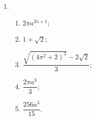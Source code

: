 % 
\begin{enumerate}
    \item %
        \begin{enumerate}[(1)]
            \item %
                $2\pi a^{2n+1}$;
            \item %
                $1 + \sqrt{2}$;
            \item %
                $\dfrac{\sqrt{(4\pi^2+2)^3} - 2\sqrt{2}}{3}$;
            \item %
                $\dfrac{2\pi a^3}{3}$;
            \item %
                $\dfrac{256a^3}{15}$.
        \end{enumerate}
\end{enumerate}
% 
